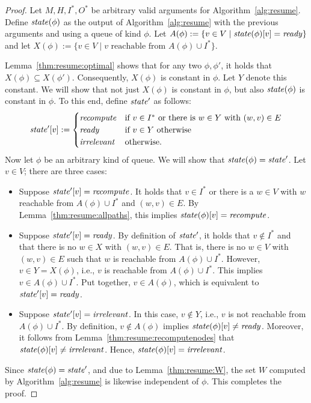 \documentclass[paper=letter,fontsize=11pt,captions=tableheading]{scrartcl}
\numberwithin{equation}{section}
\newcommand{\SiM}{\mathchoice{\,}{}{}{}}
\theoremstyle{algorithm}
\theoremstyle{plain}
\theoremstyle{nonumberplain}
\newtheorem{proof}{Proof}
\begin{document}
\begin{proof}
	Let $M, H, I^*, O^*$ be arbitrary valid arguments for Algorithm~\ref{alg:resume}. Define $\mathit{state}(\phi)$ as the output of Algorithm~\ref{alg:resume} with the previous arguments and using a queue of kind $\phi$. Let $A(\phi) := \{ v \in V \mid \mathit{state}(\phi)[v] = \mathit{ready}\}$ and let $X(\phi) := \{ v \in V \mid v \text{ reachable from } A(\phi) \cup I^*\}$.

	Lemma~\ref{thm:resume:optimal} shows that for any two $\phi, \phi'$, it holds that $X(\phi) \subseteq X(\phi')$. Consequently, $X(\phi)$ is constant in $\phi$. Let $Y$ denote this constant. We will show that not just $X(\phi)$ is constant in $\phi$, but also $\mathit{state}(\phi)$ is constant in $\phi$. To this end, define $\mathit{state}'$ as follows:
	\begin{gather*}
		\state'[v] := \begin{cases}
				\recompute & \text{if $v \in I^*$ or there is $w \in Y$ with $(w,v) \in E$} \\
				\ready & \text{if $v \in Y$ otherwise} \\
				\irrelevant & \text{otherwise}\SiM.
			\end{cases}
	\end{gather*}
	Now let $\phi$ be an arbitrary kind of queue. We will show that $\mathit{state}(\phi) = \mathit{state}'$. Let $v \in V$; there are three cases:
	\begin{itemize}
		\item Suppose $\mathit{state}'[v] = \mathit{recompute}$. It holds that $v \in I^*$ or there is a $w \in V$ with $w$ reachable from $A(\phi) \cup I^*$ and $(w,v) \in E$. By Lemma~\ref{thm:resume:allpaths}, this implies $\mathit{state}(\phi)[v] = \mathit{recompute}$.
		\item Suppose $\mathit{state}'[v] = \mathit{ready}$. By definition of $\mathit{state}'$, it holds that $v \notin I^*$ and that there is no $w \in X$ with $(w,v) \in E$. That is, there is no $w \in V$ with $(w,v) \in E$ such that $w$ is reachable from $A(\phi) \cup I^*$. However, $v \in Y = X(\phi)$, i.e., $v$ is reachable from $A(\phi) \cup I^*$. This implies $v \in A(\phi) \cup I^*$. Put together, $v \in A(\phi)$, which is equivalent to $\mathit{state}'[v] = \mathit{ready}$.
		\item Suppose $\mathit{state}'[v] = \mathit{irrelevant}$. In this case, $v \notin Y$, i.e., $v$ is not reachable from $A(\phi) \cup I^*$. By definition, $v \notin A(\phi)$ implies $\mathit{state}(\phi)[v] \neq \mathit{ready}$. Moreover, it follows from Lemma~\ref{thm:resume:recomputenodes} that $\mathit{state}(\phi)[v] \neq \mathit{irrelevant}$. Hence, $\mathit{state}(\phi)[v] = \mathit{irrelevant}$.
	\end{itemize}
	Since $\mathit{state}(\phi) = \mathit{state}'$, and due to Lemma~\ref{thm:resume:W}, the set $W$ computed by Algorithm~\ref{alg:resume} is likewise independent of $\phi$. This completes the proof.
\end{proof}
\end{document}
